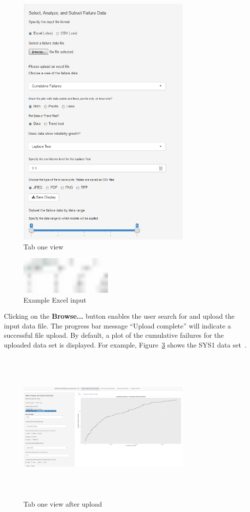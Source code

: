 \documentclass[conference]{IEEEtran}
\begin{document}
\begin{figure}[!h]
\centering
\includegraphics[width=3.4in]{Figures/Fig2}
\caption{Tab one view}
\label{fig_Tab1_leftCol}
\end{figure}

\begin{figure}[!h]
\centering
\includegraphics[width=1.8in]{Figures/sys1excel}
\caption{Example Excel input}
\label{fig_Excel_sys1}
\end{figure}

Clicking on the \textbf{Browse...} button enables the user search for and upload the input data file. The progress bar message ``Upload complete'' will indicate a successful file upload. By default, a plot of the cumulative failures for the uploaded data set is displayed. For example, Figure~\ref{fig_Tab1_CDF} shows the SYS1 data set~\cite{BookHoSRE}.

\begin{figure}[!h]
\centering
\includegraphics[width=3.4in, height=3in]{Figures/Fig4}
\caption{Tab one view after upload}
\label{fig_Tab1_CDF}
\end{figure}
\end{document}
